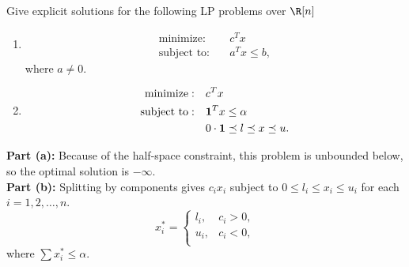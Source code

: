 \documentclass[11pt]{article}
\DeclareMathOperator{\minimize}{minimize:}
\DeclareMathOperator{\subjectto}{subject\ to:}
\begin{document}
\pagebreak

\begin{homeworkProblem}
    Give explicit solutions for the following LP problems over $\R[n]$
    \begin{enumerate}[label=(\alph*), topsep=5pt, itemsep=5pt]
        \item \begin{align*}
                  \minimize  & \quad  c^T x         \\
                  \subjectto & \quad  a^T x \leq b,
              \end{align*} where $a \neq 0$.
        \item \begin{align*}
                  \minimize  & \quad  c^T x                                                      \\
                  \subjectto & \quad  \mathbf{1}^T x \leq \alpha                                 \\
                             & \quad  0 \cdot \mathbf{1} \preceq l \preceq x \preceq u. \newline
              \end{align*}
    \end{enumerate}

    \solution

    \textbf{Part (a):} Because of the half-space constraint, this problem is unbounded below, so the optimal solution is $-\infty$. \\

    \textbf{Part (b):} Splitting by components gives $c_i x_i$ subject to $0 \leq l_i \leq x_i \leq u_i$ for each $i = 1, 2, \ldots, n$.
    \[
        x_i^* =
        \begin{cases}
            l_i, & c_i > 0, \\
            u_i, & c_i < 0, \\
        \end{cases}
    \] where $\sum x_i^* \leq \alpha$.
\end{homeworkProblem}

\pagebreak
\end{document}
